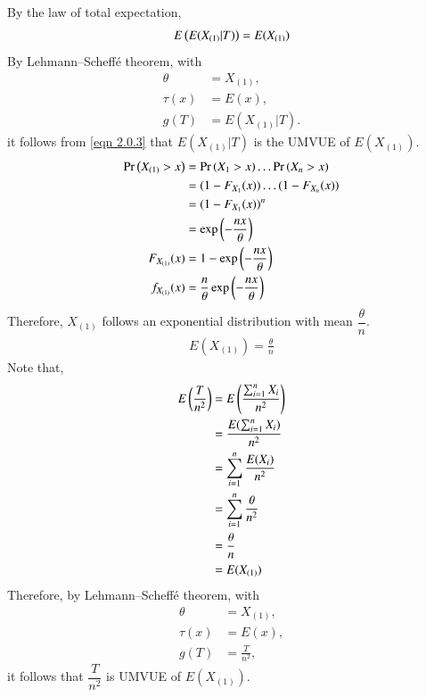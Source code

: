\documentclass[journal,12pt,twocolumn]{IEEEtran}
\begin{document}
By the law of total expectation, 
\begin{align}
\label{eqn 2.0.3}
E\left(E(X_{(1)} | T )\right) = E(X_{(1)})
\end{align}
By Lehmann–Scheffé theorem, with
\begin{align}
\theta &= X_{(1)},\\ 
\tau(x) &= E(x),\\
g(T) &= E(X_{(1)} | T).
\end{align}
it follows from \eqref{eqn 2.0.3} that $E(X_{(1)} | T)$ is the UMVUE of $E(X_{(1)})$.
\begin{align}
\Pr\left(X_{(1)} > x\right) &= \Pr\left(X_1 > x\right)\ldots \Pr\left(X_n > x\right)\\
&= (1-F_{X_{1}}(x))\ldots(1-F_{X_{n}}(x))\\
&= (1-F_{X_{1}}(x))^n \\
&= \exp\left(-\frac{nx}{\theta}\right)\\
F_{X_{(1)}}(x) &= 1 - \exp\left(-\frac{nx}{\theta}\right)\\
f_{X_{(1)}}(x) &= \frac{n}{\theta} \exp\left(-\frac{nx}{\theta}\right)
\end{align}
Therefore, $X_{(1)}$ follows an exponential distribution with mean $\dfrac{\theta}{n}$.
\begin{align}
E(X_{(1)}) = \frac{\theta}{n}
\end{align}
Note that,
\begin{align}
E\left(\frac{T}{n^2}\right) &= E\left(\frac{\sum_{i=1}^n X_i}{n^2}\right)\\
&= \frac{E(\sum_{i=1}^n X_i)}{n^2}\\
&= \sum_{i=1}^n \frac{E(X_i)}{n^2}\\
&= \sum_{i=1}^n \frac{\theta}{n^2}\\
&= \frac{\theta}{n}\\
&= E(X_{(1)})
\end{align}
Therefore, by Lehmann–Scheffé theorem, with
\begin{align}
\theta &= X_{(1)},\\
\tau(x) &= E(x),\\
g(T) &= \frac{T}{n^2},
\end{align}
it follows that $\dfrac{T}{n^2}$ is UMVUE of $E(X_{(1)})$.\\
\end{document}
